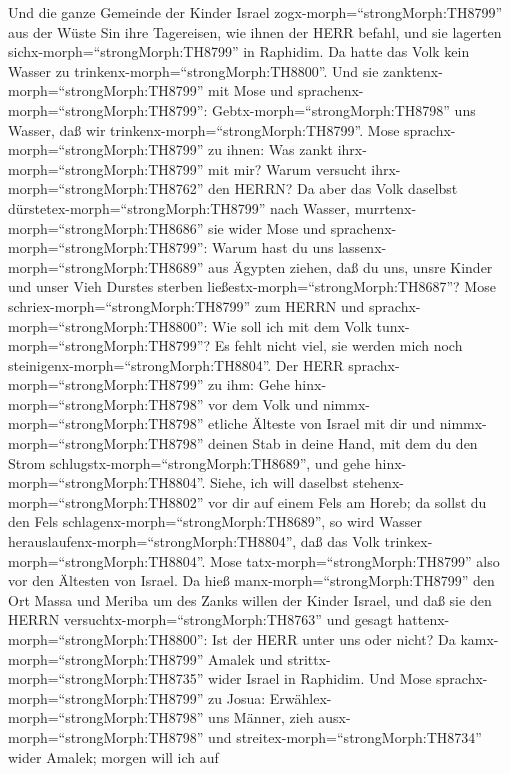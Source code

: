  Und die ganze Gemeinde der Kinder Israel
zogx-morph=``strongMorph:TH8799'' aus der Wüste Sin ihre Tagereisen, wie
ihnen der HERR befahl, und sie lagerten
sichx-morph=``strongMorph:TH8799'' in Raphidim. Da hatte das Volk kein
Wasser zu trinkenx-morph=``strongMorph:TH8800''.  Und sie
zanktenx-morph=``strongMorph:TH8799'' mit Mose und
sprachenx-morph=``strongMorph:TH8799'':
Gebtx-morph=``strongMorph:TH8798'' uns Wasser, daß wir
trinkenx-morph=``strongMorph:TH8799''. Mose
sprachx-morph=``strongMorph:TH8799'' zu ihnen: Was zankt
ihrx-morph=``strongMorph:TH8799'' mit mir? Warum versucht
ihrx-morph=``strongMorph:TH8762'' den HERRN?  Da aber das
Volk daselbst dürstetex-morph=``strongMorph:TH8799'' nach Wasser,
murrtenx-morph=``strongMorph:TH8686'' sie wider Mose und
sprachenx-morph=``strongMorph:TH8799'': Warum hast du uns
lassenx-morph=``strongMorph:TH8689'' aus Ägypten ziehen, daß du uns,
unsre Kinder und unser Vieh Durstes sterben
ließestx-morph=``strongMorph:TH8687''?  Mose
schriex-morph=``strongMorph:TH8799'' zum HERRN und
sprachx-morph=``strongMorph:TH8800'': Wie soll ich mit dem Volk
tunx-morph=``strongMorph:TH8799''? Es fehlt nicht viel, sie werden mich
noch steinigenx-morph=``strongMorph:TH8804''.  Der HERR
sprachx-morph=``strongMorph:TH8799'' zu ihm: Gehe
hinx-morph=``strongMorph:TH8798'' vor dem Volk und
nimmx-morph=``strongMorph:TH8798'' etliche Älteste von Israel mit dir
und nimmx-morph=``strongMorph:TH8798'' deinen Stab in deine Hand, mit
dem du den Strom schlugstx-morph=``strongMorph:TH8689'', und gehe
hinx-morph=``strongMorph:TH8804''.  Siehe, ich will daselbst
stehenx-morph=``strongMorph:TH8802'' vor dir auf einem Fels am Horeb; da
sollst du den Fels schlagenx-morph=``strongMorph:TH8689'', so wird
Wasser herauslaufenx-morph=``strongMorph:TH8804'', daß das Volk
trinkex-morph=``strongMorph:TH8804''. Mose
tatx-morph=``strongMorph:TH8799'' also vor den Ältesten von Israel.
 Da hieß manx-morph=``strongMorph:TH8799'' den Ort Massa und
Meriba um des Zanks willen der Kinder Israel, und daß sie den HERRN
versuchtx-morph=``strongMorph:TH8763'' und gesagt
hattenx-morph=``strongMorph:TH8800'': Ist der HERR unter uns oder nicht?
 Da kamx-morph=``strongMorph:TH8799'' Amalek und
strittx-morph=``strongMorph:TH8735'' wider Israel in Raphidim.
 Und Mose sprachx-morph=``strongMorph:TH8799'' zu Josua:
Erwählex-morph=``strongMorph:TH8798'' uns Männer, zieh
ausx-morph=``strongMorph:TH8798'' und
streitex-morph=``strongMorph:TH8734'' wider Amalek; morgen will ich auf
